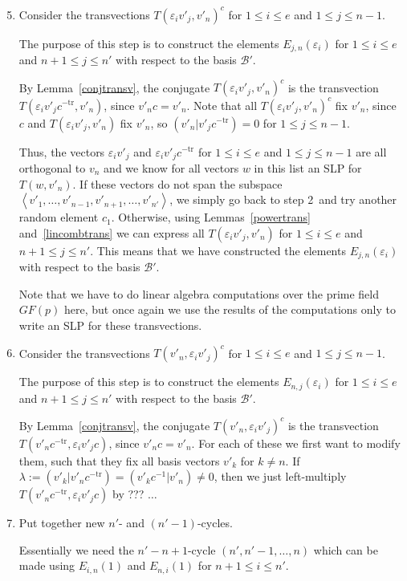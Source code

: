 \documentclass[a4paper,11pt]{article}
\newcommand{\tr}{\mathrm{tr}}
\newcommand{\B}{\mathcal{B}}
\begin{document}
\begin{enumerate}
\setcounter{enumi}{4}
\item Consider the transvections $T(\varepsilon_i v'_j,v'_n)^c$ 
for $1 \le i \le e$ and $1 \le j \le n-1$.

The purpose of this step is to construct the elements
$E_{j,n}(\varepsilon_i)$ for $1 \le i \le e$ and $n+1 \le j \le n'$
with respect to the basis $\B'$.

By Lemma~\ref{conjtransv}, 
the conjugate $T(\varepsilon_i v'_j,v'_n)^c$ is the transvection
$T(\varepsilon_i v'_j c^{-\tr},v'_n)$,
since $v'_nc = v'_n$. Note that all
$T(\varepsilon_i v'_j,v'_n)^c$ fix $v'_n$, since $c$ and
$T(\varepsilon_i v'_j,v'_n)$ fix $v'_n$, so $(v'_n|v'_jc^{-\tr}) = 0$ 
for $1 \le j \le n-1$.

Thus, the vectors $\varepsilon_i v'_j$ and $\varepsilon_i v'_j c^{-\tr}$
for $1 \le i \le e$ and $1 \le j \le n-1$
are all orthogonal to $v_n$ and we know for all 
vectors $w$ in this list an SLP for $T(w,v'_n)$.
If these vectors do not span the subspace
$\left< v'_1, \ldots, v'_{n-1}, v'_{n+1}, \ldots, v'_{n'}\right>$, we
simply go back to step 2~and try another random element $c_1$.
Otherwise, using Lemmas~\ref{powertrans} and~\ref{lincombtrans} we
can express all $T(\varepsilon_i v'_j,v'_n)$ for $1 \le i \le e$ and
$n+1 \le j \le n'$. This means that we have constructed the elements
$E_{j,n}(\varepsilon_i)$ with respect to the basis $\B'$.

Note that we have to do linear algebra computations 
over the prime field $GF(p)$ here,
but once again we use the results of the computations only 
to write an SLP for these transvections.

\item Consider the transvections $T(v'_n,\varepsilon_i v'_j)^c$ for
$1 \le i \le e$ and $1 \le j \le n-1$.

The purpose of this step is to construct the elements
$E_{n,j}(\varepsilon_i)$ for $1 \le i \le e$ and $n+1 \le j \le n'$
with respect to the basis $\B'$.

By Lemma~\ref{conjtransv}, 
the conjugate $T(v'_n,\varepsilon_i v'_j)^c$ is the transvection
$T(v'_n c^{-\tr},\varepsilon_i v'_j c)$,
since $v'_nc = v'_n$. For each of these we first want to modify them,
such that they fix all basis vectors $v'_k$ for $k \neq n$. If
$\lambda := (v'_k | v'_n c^{-\tr}) = (v'_k c^{-1} | v'_n) \neq 0$, then
we just left-multiply $T(v'_n c^{-\tr},\varepsilon_i v'_j c)$ by
??? $\ldots$

\item Put together new $n'$- and $(n'-1)$-cycles.

Essentially we need the $n'-n+1$-cycle $(n',n'-1, \ldots, n)$ which can 
be made using $E_{i,n}(1)$ and $E_{n,i}(1)$ for $n+1 \le i \le n'$.
\end{enumerate}
\end{document}
